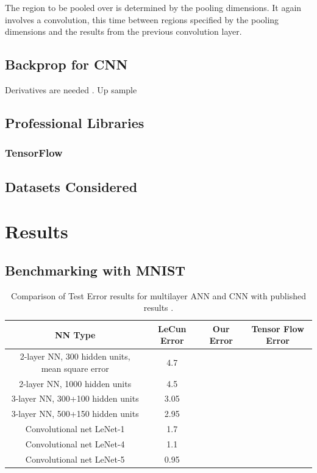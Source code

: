 \documentclass[12pt, twocolumn]{article}
\begin{document}
The region to be pooled over is determined by the pooling dimensions. It again involves a convolution, this time between regions specified by the pooling dimensions and the results from the previous convolution layer. 



\subsection{Backprop for CNN}
Derivatives are needed . Up sample
\subsection{Professional Libraries}
\subsubsection{TensorFlow}



\subsection{Datasets Considered}



\section{Results}



\subsection{Benchmarking with MNIST}
\begin{center}
\begin{table}[t]
\begin{tabular} { |c | c | c | c | }
    \hline
    NN Type & LeCun Error  &  Our Error  & Tensor Flow Error \\ \hline
    2-layer NN, 300 hidden units, mean square error & 4.7 &  & \\ \hline
    2-layer NN, 1000 hidden units & 4.5 & & \\ \hline
    3-layer NN, 300+100 hidden units & 3.05 & &  \\ \hline
    3-layer NN, 500+150 hidden units & 2.95 & & \\ \hline
    Convolutional net LeNet-1 & 1.7 &  & \\ \hline 
    Convolutional net LeNet-4 & 1.1& & \\ \hline 
    Convolutional net LeNet-5 &  0.95 & &\\ \hline
\end{tabular}
\label{table: MNISTLeCun}
\caption{Comparison of Test Error results for multilayer ANN and CNN with published results \cite{LeCun1998}.}
\end{table}
\end{center}
\end{document}
